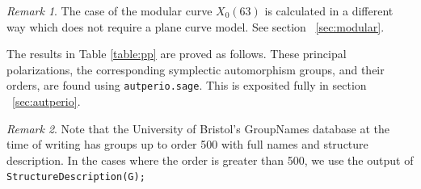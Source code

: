 \documentclass[12pt,reqno]{amsart}
\theoremstyle{definition}
\theoremstyle{remark}
\newtheorem*{remark}{Remark}
\begin{document}
\begin{remark} The case of the modular curve $X_0(63)$ is calculated in a different way which does not require a plane curve model. See section ~\ref{sec:modular}. \end{remark}

The results in Table \ref{table:pp} are proved as follows. These principal polarizations, the corresponding symplectic automorphism groups, and their orders, are found using \texttt{autperio.sage}. This is exposited fully in section ~\ref{sec:autperio}.   


\begin{remark} Note that the University of Bristol's GroupNames database at the time of writing has groups up to order 500 with full names and structure description. In the cases where the order is greater than 500, we use the output of \texttt{StructureDescription(G);}  \end{remark}

\newpage
\end{document}
